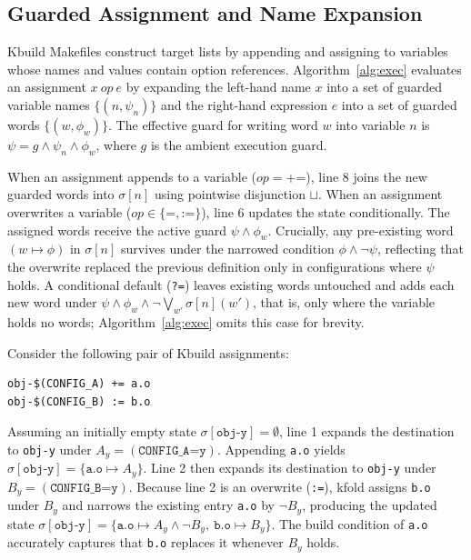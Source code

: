 \documentclass[acmsmall]{acmart}
\newcommand{\tool}{\textsf{kfold}\xspace}
\begin{document}
\subsection{Guarded Assignment and Name Expansion}\label{sec:technique:assign}

Kbuild Makefiles construct target lists by appending and assigning to variables whose names and values contain option references.
Algorithm~\ref{alg:exec} evaluates an assignment $x\ \mathit{op}\ e$ by expanding the left-hand name $x$ into a set of guarded variable names $\{(n, \psi_n)\}$ and the right-hand expression $e$ into a set of guarded words $\{(w, \phi_w)\}$.
The effective guard for writing word $w$ into variable $n$ is $\psi = g \land \psi_n \land \phi_w$, where $g$ is the ambient execution guard.

When an assignment appends to a variable ($\mathit{op} = \texttt{+=}$), line 8 joins the new guarded words into $\sigma[n]$ using pointwise disjunction $\sqcup$.
When an assignment overwrites a variable ($\mathit{op} \in \{\texttt{=}, \texttt{:=}\}$), line 6 updates the state conditionally.
The assigned words receive the active guard $\psi \land \phi_w$.
Crucially, any pre-existing word $(w \mapsto \phi)$ in $\sigma[n]$ survives under the narrowed condition $\phi \land \neg\psi$, reflecting that the overwrite replaced the previous definition only in configurations where $\psi$ holds.
A conditional default (\texttt{?=}) leaves existing words untouched and adds each new word under $\psi \land \phi_w \land \neg\bigvee_{w'} \sigma[n](w')$, that is, only where the variable holds no words; Algorithm~\ref{alg:exec} omits this case for brevity.

Consider the following pair of Kbuild assignments:
\begin{lstlisting}[style=kbuild-example]
obj-$(CONFIG_A) += a.o
obj-$(CONFIG_B) := b.o
\end{lstlisting}
Assuming an initially empty state $\sigma[\texttt{obj-y}] = \emptyset$, line 1 expands the destination to \texttt{obj-y} under $A_y = (\texttt{CONFIG\_A=y})$.
Appending \texttt{a.o} yields $\sigma[\texttt{obj-y}] = \{\texttt{a.o} \mapsto A_y\}$.
Line 2 then expands its destination to \texttt{obj-y} under $B_y = (\texttt{CONFIG\_B=y})$.
Because line 2 is an overwrite (\texttt{:=}), \tool assigns \texttt{b.o} under $B_y$ and narrows the existing entry \texttt{a.o} by $\neg B_y$, producing the updated state $\sigma[\texttt{obj-y}] = \{\texttt{a.o} \mapsto A_y \land \neg B_y,\ \texttt{b.o} \mapsto B_y\}$.
The build condition of \texttt{a.o} accurately captures that \texttt{b.o} replaces it whenever $B_y$ holds.
\end{document}

